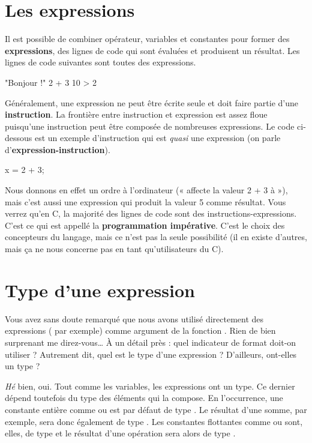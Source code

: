 \section{Les expressions}

Il est possible de combiner opérateur, variables et constantes pour
former des \textbf{expressions}, des lignes de code qui sont évaluées et
produisent un résultat. Les lignes de code suivantes sont toutes des
expressions.

\begin{C}
"Bonjour !"
2 + 3
10 > 2
\end{C}

Généralement, une expression ne peut être écrite seule et doit faire
partie d'une \textbf{instruction}. La frontière entre instruction et
expression est assez floue puisqu'une instruction peut être composée de
nombreuses expressions. Le code ci-dessous est un exemple d'instruction
qui est \emph{quasi} une expression (on parle
d'\textbf{expression-instruction}).

\begin{C}
x = 2 + 3;
\end{C}

Nous donnons en effet un ordre à l'ordinateur (« affecte la valeur 2 + 3
à  »), mais c'est aussi une expression qui produit la valeur 5
comme résultat. Vous verrez qu'en C, la majorité des lignes de code sont
des instructions-expressions. C'est ce qui est appellé la
\textbf{programmation impérative}. C'est le choix des concepteurs du
langage, mais ce n'est pas la seule possibilité (il en existe d'autres,
mais ça ne nous concerne pas en tant qu'utilisateurs du C).

\section{Type d'une expression}
\label{type-dune-expression}

Vous avez sans doute remarqué que nous avons utilisé directement des
expressions ( par exemple) comme argument de la fonction
. Rien de bien surprenant me direz-vous\ldots{} À un
détail près : quel indicateur de format doit-on utiliser ? Autrement
dit, quel est le type d'une expression ? D'ailleurs, ont-elles un type ?

\emph{Hé} bien, oui. Tout comme les variables, les expressions ont un
type. Ce dernier dépend toutefois du type des éléments qui la compose.
En l'occurrence, une constante entière comme  ou 
est par défaut de type . Le résultat d'une somme, par
exemple, sera donc également de type . Les constantes
flottantes comme  ou  sont, elles, de type
 et le résultat d'une opération sera alors de type
.

